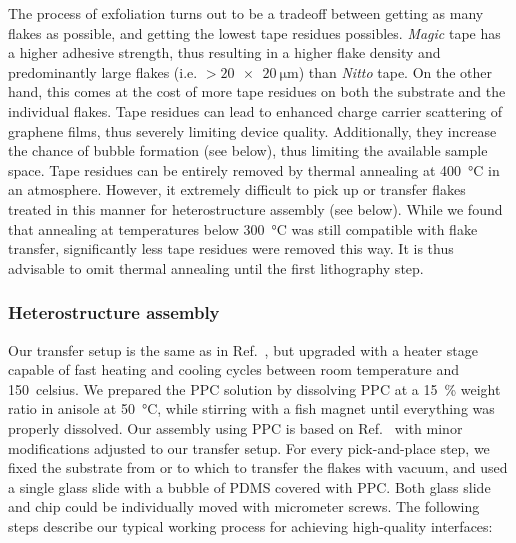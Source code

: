 The process of exfoliation turns out to be a tradeoff between getting as many flakes as possible, and getting the lowest tape residues possibles.
% 
\textit{Magic} tape has a higher adhesive strength, thus resulting in a higher flake density and predominantly large flakes (i.e. $>\SI{20x20}{\micro\meter}$) than \textit{Nitto} tape.
% 
On the other hand, this comes at the cost of more tape residues on both the substrate and the individual flakes.
% 
Tape residues can lead to enhanced charge carrier scattering of graphene films, thus severely limiting device quality.
% 
Additionally, they increase the chance of bubble formation (see below), thus limiting the available sample space.
% 
Tape residues can be entirely removed by thermal annealing at \SI{400}{\celsius} in  an  atmosphere.
% 
However, it extremely difficult to pick up or transfer flakes treated in this manner for heterostructure assembly (see below).
% 
While we found that annealing at temperatures below \SI{300}{\celsius} was still compatible with flake transfer, significantly less tape residues were removed this way.
% 
It is thus advisable to omit thermal annealing until the first lithography step.

\subsubsection{Heterostructure assembly}

Our transfer setup is the same as in Ref.~\cite{castellanos-gomezDeterministicTransferTwodimensional2014}, but upgraded with a heater stage capable of fast heating and cooling cycles between room temperature and \SI{150}{celsius}.
% 
We prepared the PPC solution by dissolving PPC at a \SI{15}{\percent} weight ratio in anisole at \SI{50}{\celsius}, while stirring with a fish magnet until everything was properly dissolved.
% 
Our assembly using PPC is based on Ref.~\cite{pizzoccheroHotPickupTechnique2016} with minor modifications adjusted to our transfer setup.
% 
For every pick-and-place step, we fixed the substrate from or to which to transfer the flakes with vacuum, and used a single glass slide with a bubble of PDMS covered with PPC.
%
Both glass slide and chip could be individually moved with micrometer screws.
%
The following steps describe our typical working process for achieving high-quality interfaces:

